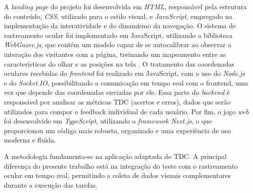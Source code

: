 
A \textit{landing page} do projeto foi desenvolvida em \textit{HTML}, responsável pela estrutura do conteúdo, \textit{CSS}, utilizado para o estilo visual, e \textit{JavaScript}, empregado na implementação da interatividade e do dinamismo da navegação. O sistema de rastreamento ocular foi implementado em JavaScript, utilizando a biblioteca \textit{WebGazer.js}, que contém um modelo capaz de se autocalibrar ao observar a interação dos visitantes com a página, treinando um mapeamento entre as características do olhar e as posições na tela \cite{papoutsaki2016webgazer}. O tratamento das coordenadas oculares recebidas do \textit{frontend} foi realizado em JavaScript, com o uso do \textit{Node.js} e do \textit{Socket.IO}, possibilitando a comunicação em tempo real com o frontend, uma vez que depende das coordenadas enviadas por ele. Essa parte do \textit{backend} é responsável por analisar as métricas TDC (acertos e erros), dados que serão utilizados para compor o feedback individual de cada usuário. Por fim, o jogo \textit{web} foi desenvolvido em \textit{TypeScript}, utilizando o \textit{framework} \textit{Next.js}, o que proporcionou um código mais robusto, organizado e uma experiência de uso moderna e fluida.

A metodologia fundamenta-se na aplicação adaptada do TDC. A principal diferença do presente trabalho está na integração do teste com o rastreamento ocular em tempo real, permitindo a coleta de dados visuais complementares durante a execução das tarefas.

